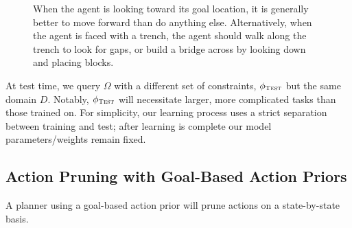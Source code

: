 \documentclass[11pt]{article}
\begin{document}
\begin{figure}
\centering
{}
\label{fig:example_affs}
\caption{When the agent is looking toward its goal location, it is generally better to move forward than do anything else. Alternatively, when the agent is faced with a trench, the agent should walk along the trench to look for gaps, or build a bridge across by looking down and placing blocks.}
\end{figure}

At test time, we query $\Omega$ with a different set of constraints, $\phi_{\textsc{Test}}$ but the same domain $D$. Notably, $\phi_{\textsc{Test}}$ will necessitate larger, more complicated tasks than those trained on. For simplicity, our learning process uses a strict separation between training and test; after learning is complete our model parameters/weights remain fixed.

\subsection{Action Pruning with Goal-Based Action Priors}
\label{sec:action_pruning}
A planner using a goal-based action prior will prune actions on a state-by-state basis. 
\end{document}
